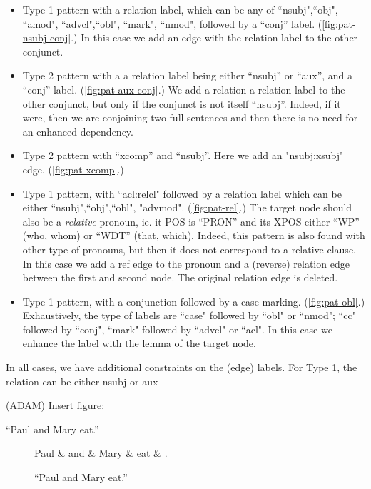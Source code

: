 \documentclass[11pt,a4paper]{article}
\begin{document}
\begin{itemize}
\item Type 1 pattern with a relation label, which can be any of
  ``nsubj",``obj", ``amod", ``advcl",``obl", ``mark", ``nmod", followed by a
  ``conj'' label. (\cref{fig:pat-nsubj-conj}.) In this case we add an
  edge with the relation label to the other conjunct.
\item Type 2 pattern with a a relation label being either ``nsubj'' or
  ``aux'', and a ``conj'' label. (\cref{fig:pat-aux-conj}.) We add a relation a relation label to
  the other conjunct, but only if the conjunct is not itself
  ``nsubj''. Indeed, if it were, then we are conjoining two full
  sentences and then there is no need for an enhanced dependency.
\item Type 2 pattern with ``xcomp'' and ``nsubj''. Here we add an
  "nsubj:xsubj" edge. (\cref{fig:pat-xcomp}.)
\item Type 1 pattern, with ``acl:relcl" followed by a relation label
  which can be either ``nsubj",``obj",``obl",
  "advmod". (\cref{fig:pat-rel}.) The target node should also be a
  \emph{relative} pronoun, ie. it POS is ``PRON'' and its XPOS either
  ``WP'' (who, whom) or ``WDT'' (that, which). Indeed, this pattern is
  also found with other type of pronouns, but then it does not
  correspond to a relative clause.  In this case we add a ref edge to
  the pronoun and a (reverse) relation edge between the first and
  second node. The original relation edge is deleted.
\item Type 1 pattern, with a conjunction followed by a case
  marking. (\cref{fig:pat-obl}.) Exhaustively, the type of labels are ``case" followed by
  ``obl" or ``nmod"; ``cc" followed by ``conj", ``mark" followed by ``advcl"
  or ``acl". In this case we enhance the label with the lemma of the target node.
\end{itemize}
In all cases, we have additional constraints on the
(edge) labels. For Type 1, the relation can be either nsubj or aux


(ADAM) Insert figure:

``Paul and Mary eat.''

\begin{figure}[h]
\centering
\begin{dependency}
\begin{deptext}[column sep=1em]
Paul \& and \& Mary \& eat \& . \\
\end{deptext}
\end{dependency}
\caption{``Paul and Mary eat.''}
\end{figure}
    
\end{document}
